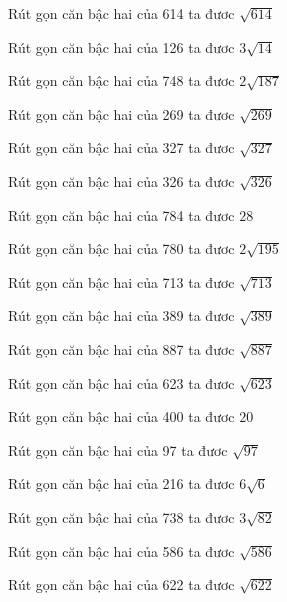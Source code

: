 \documentclass[12pt,a4paper]{article}
\begin{document}
\begin{ex}
Rút gọn căn bậc hai của 614 ta đươc $\sqrt{614}$
\end{ex}
\begin{ex}
Rút gọn căn bậc hai của 126 ta đươc $3\sqrt{14}$
\end{ex}
\begin{ex}
Rút gọn căn bậc hai của 748 ta đươc $2\sqrt{187}$
\end{ex}
\begin{ex}
Rút gọn căn bậc hai của 269 ta đươc $\sqrt{269}$
\end{ex}
\begin{ex}
Rút gọn căn bậc hai của 327 ta đươc $\sqrt{327}$
\end{ex}
\begin{ex}
Rút gọn căn bậc hai của 326 ta đươc $\sqrt{326}$
\end{ex}
\begin{ex}
Rút gọn căn bậc hai của 784 ta đươc $28$
\end{ex}
\begin{ex}
Rút gọn căn bậc hai của 780 ta đươc $2\sqrt{195}$
\end{ex}
\begin{ex}
Rút gọn căn bậc hai của 713 ta đươc $\sqrt{713}$
\end{ex}
\begin{ex}
Rút gọn căn bậc hai của 389 ta đươc $\sqrt{389}$
\end{ex}
\begin{ex}
Rút gọn căn bậc hai của 887 ta đươc $\sqrt{887}$
\end{ex}
\begin{ex}
Rút gọn căn bậc hai của 623 ta đươc $\sqrt{623}$
\end{ex}
\begin{ex}
Rút gọn căn bậc hai của 400 ta đươc $20$
\end{ex}
\begin{ex}
Rút gọn căn bậc hai của 97 ta đươc $\sqrt{97}$
\end{ex}
\begin{ex}
Rút gọn căn bậc hai của 216 ta đươc $6\sqrt{6}$
\end{ex}
\begin{ex}
Rút gọn căn bậc hai của 738 ta đươc $3\sqrt{82}$
\end{ex}
\begin{ex}
Rút gọn căn bậc hai của 586 ta đươc $\sqrt{586}$
\end{ex}
\begin{ex}
Rút gọn căn bậc hai của 622 ta đươc $\sqrt{622}$
\end{ex}
\end{document}
